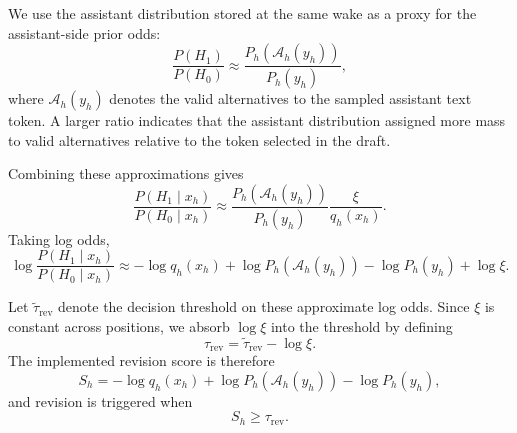 We use the assistant distribution stored at the same wake as a proxy for the assistant-side prior odds:
\begin{equation}
\frac{P(H_1)}{P(H_0)}
\approx
\frac{P_h(\mathcal{A}_h(y_h))}
     {P_h(y_h)},
\end{equation}
where $\mathcal{A}_h(y_h)$ denotes the valid alternatives to the sampled assistant text token.
A larger ratio indicates that the assistant distribution assigned more mass to valid alternatives relative to the token selected in the draft.

Combining these approximations gives
\begin{equation}
\frac{P(H_1\mid x_h)}{P(H_0\mid x_h)}
\approx
\frac{P_h(\mathcal{A}_h(y_h))}
     {P_h(y_h)}
\frac{\xi}{q_h(x_h)}.
\end{equation}
Taking log odds,
\begin{equation}
\log
\frac{P(H_1\mid x_h)}{P(H_0\mid x_h)}
\approx
-\log q_h(x_h)
+
\log P_h(\mathcal{A}_h(y_h))
-
\log P_h(y_h)
+
\log\xi.
\end{equation}

Let $\tilde{\tau}_{\mathrm{rev}}$ denote the decision threshold on these approximate log odds.
Since $\xi$ is constant across positions, we absorb $\log\xi$ into the threshold by defining
\begin{equation}
\tau_{\mathrm{rev}}
=
\tilde{\tau}_{\mathrm{rev}}-\log\xi.
\end{equation}
The implemented revision score is therefore
\begin{equation}
S_h
=
-\log q_h(x_h)
+
\log P_h(\mathcal{A}_h(y_h))
-
\log P_h(y_h),
\label{aeq:revision_score_impl}
\end{equation}
and revision is triggered when
\begin{equation}
S_h \geq \tau_{\mathrm{rev}}.
\end{equation}

